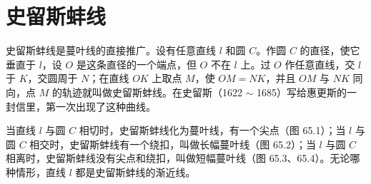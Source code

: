 \section{史留斯蚌线}

史留斯蚌线是蔓叶线的直接推广。设有任意直线 $l$ 和圆 $C$。作圆 $C$ 的直径，使它垂直于 $l$，设 $O$ 是这条直径的一个端点，但 $O$ 不在 $l$ 上。过 $O$ 作任意直线，交 $l$ 于 $K$，交圆周于 $N$；在直线 $OK$ 上取点 $M$，使 $OM=NK$，并且 $OM$ 与 $NK$ 同向，点 $M$ 的轨迹就叫做史留斯蚌线。在史留斯（1622 $\sim$ 1685）写给惠更斯的一封信里，第一次出现了这种曲线。

当直线 $l$ 与圆 $C$ 相切时，史留斯蚌线化为蔓叶线，有一个尖点（图 65.1）；当 $l$ 与圆 $C$ 相交时，史留斯蚌线有一个绕扣，叫做长幅蔓叶线（图 65.2）；当 $l$ 与圆 $C$ 相离时，史留斯蚌线没有尖点和绕扣，叫做短幅蔓叶线（图 65.3、65.4）。无论哪种情形，直线 $l$ 都是史留斯蚌线的渐近线。

